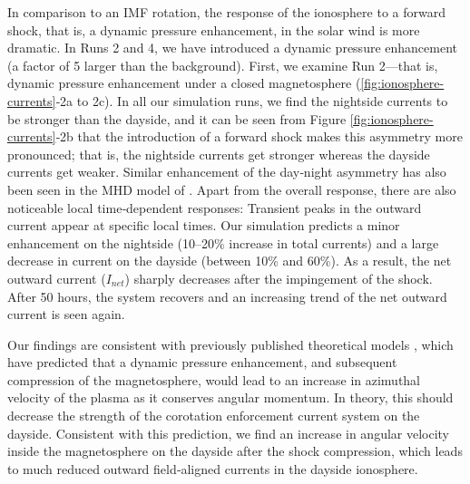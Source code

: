 In comparison to an IMF rotation, the response of the ionosphere to a forward shock, that is, a dynamic pressure enhancement, in the solar wind is more dramatic. In Runs 2 and 4, we have introduced a dynamic pressure enhancement (a factor of 5 larger than the background). First, we examine Run 2—that is, dynamic pressure enhancement under a closed magnetosphere (\ref{fig:ionosphere-currents}‐2a to 2c). In all our simulation runs, we find the nightside currents to be stronger than the dayside, and it can be seen from Figure \ref{fig:ionosphere-currents}‐2b that the introduction of a forward shock makes this asymmetry more pronounced; that is, the nightside currents get stronger whereas the dayside currents get weaker. Similar enhancement of the day‐night asymmetry has also been seen in the MHD model of \cite{Chane2017a}. Apart from the overall response, there are also noticeable local time‐dependent responses: Transient peaks in the outward current appear at specific local times. Our simulation predicts a minor enhancement on the nightside (10–20\% increase in total currents) and a large decrease in current on the dayside (between 10\% and 60\%). As a result, the net outward current ($I_{net}$) sharply decreases after the impingement of the shock. After 50 hours, the system recovers and an increasing trend of the net outward current is seen again. 

Our findings are consistent with previously published theoretical models 
\cite{Cowley2003a,Cowley2007,Southwood2001a}, which have predicted that a dynamic pressure enhancement, and subsequent compression of the magnetosphere, would lead to an increase in azimuthal velocity of the plasma as it conserves angular momentum. In theory, this should decrease the strength of the corotation enforcement current system on the dayside. Consistent with this prediction, we find an increase in angular velocity inside the magnetosphere on the dayside after the shock compression, which leads to much reduced outward field‐aligned currents in the dayside ionosphere. 

